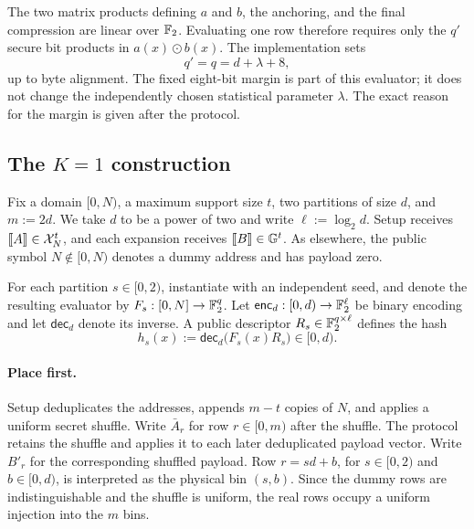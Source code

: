 The two matrix products defining $a$ and $b$, the anchoring, and the final
compression are linear over $\mathbb{F}_2$.  Evaluating one row therefore requires
only the $q'$ secure bit products in $a(x)\odot b(x)$.  The implementation
sets
\begin{equation}\label{eq:rc-hash-widths}
 q'=q=d+\lambda+8,
\end{equation}
up to byte alignment.  The fixed eight-bit margin is part of this evaluator;
it does not change the independently chosen statistical parameter $\lambda$.
The exact reason for the margin is given after the protocol.

\subsection{The \texorpdfstring{$K=1$}{K=1} construction}

Fix a domain $[0,N)$, a maximum support size $t$, two partitions of size $d$,
and $m:=2d$.  We take $d$ to be a power of two and write
$\ell:=\log_2d$.  Setup receives
$\share A\in\mathcal X_N^t$, and each expansion receives
$\share B\in\mathbb G^t$.  As elsewhere, the public symbol
$N\notin[0,N)$ denotes a dummy address and has payload zero.

For each partition $s\in[0,2)$, instantiate 
with an independent seed, and denote the resulting evaluator by
$F_s:[0,N]\rightarrow\mathbb{F}_2^q$.  Let
$\mathsf{enc}_d:[0,d)\rightarrow\mathbb{F}_2^\ell$ be binary encoding and let
$\mathsf{dec}_d$ denote its inverse.  A public descriptor
$R_s\in\mathbb{F}_2^{q\times\ell}$ defines the hash
\begin{equation}\label{eq:rc-programmed-hash}
 h_s(x):=\mathsf{dec}_d\bigl(F_s(x)R_s\bigr)\in[0,d).
\end{equation}

\paragraph{Place first.}
Setup deduplicates the addresses, appends $m-t$ copies of $N$, and applies a
uniform secret shuffle.  Write $\bar A_r$ for row $r\in[0,m)$ after the shuffle.
The protocol retains the shuffle and applies it to each later deduplicated
payload vector.  Write $B'_r$ for the corresponding shuffled payload.  Row
$r=sd+b$, for $s\in[0,2)$ and $b\in[0,d)$, is interpreted as the physical bin
$(s,b)$.  Since the dummy rows are indistinguishable and the shuffle is
uniform, the real rows occupy a uniform injection into the $m$ bins.

